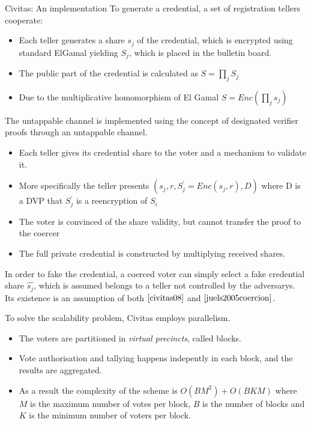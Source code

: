 \documentclass{beamer}
\begin{document}
\begin{frame}[allowframebreaks]{Civitas: An implementation}
To generate a credential, a set of registration tellers cooperate:
\begin{itemize}
	\item Each teller generates a share $s_j$ of the credential, which is encrypted using standard ElGamal yielding $S_j$, which is placed in the bulletin board.
	\item The public part of the credential is calculated as $S=\prod_j S_j$
	\item Due to the multiplicative homomorphism of El Gamal $S = Enc(\prod_j s_j)$
\end{itemize}

The untappable channel is implemented using the concept of designated verifier proofs  through an untappable channel.
\begin{itemize}
	\item Each teller gives its credential share to the voter and a mechanism to validate it.
	\item More specifically the teller presents $(s_j,r,S^{'}_{j}=Enc(s_j,r),D)$ where D is a DVP that $S^{'}_{j}$ is a reencryption of $S_i$
	\item The voter is convinced of the share validity, but cannot transfer the proof to the coercer
	\item The full private credential is constructed by multiplying received shares.
\end{itemize}

In order to fake the credential, a coerced voter can simply select a fake credential share $\hat{s_j}$, which is assumed belongs to a teller not controlled by the adversarys. Its existence is an assumption of both $\cite{civitas08}$ and $\cite{juels2005coercion}$.

To solve the scalability problem, Civitas employs parallelism. 
\begin{itemize}

\item The voters are partitioned in \textit{virtual precincts}, called blocks. 
\item Vote authorisation and tallying happens indepently in each block, and the results are aggregated.
\item As a result the complexity of the scheme is $O(BM^2) + O(BKM)$ where $M$ is the maximum number of votes per block, $B$ is the number of blocks and $K$ is the minimum number of voters per block.

\end{itemize}
\end{frame}
\end{document}
